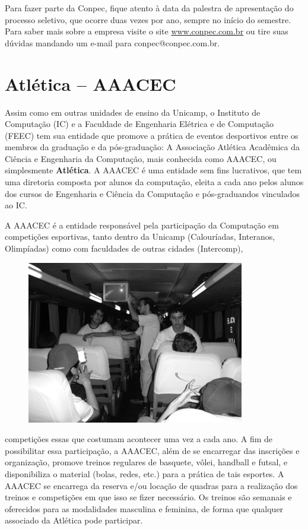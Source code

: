 Para fazer parte da Conpec, fique atento à data da palestra de apresentação do
processo seletivo, que ocorre duas vezes por ano, sempre no início do semestre.
Para saber mais sobre a empresa visite o site \url{www.conpec.com.br} ou
tire suas dúvidas mandando um e-mail para conpec@conpec.com.br.

\section{Atlética -- AAACEC}

Assim como em outras unidades de ensino da Unicamp, o Instituto de Computação
(IC) e a Faculdade de Engenharia Elétrica e de Computação (FEEC) tem sua
entidade que promove a prática de eventos desportivos entre os membros da
graduação e da pós-graduação: A Associação Atlética Acadêmica da Ciência
e Engenharia da Computação, mais conhecida como AAACEC, ou simplesmente
\textbf{Atlética}. A AAACEC é uma entidade sem fins lucrativos, que tem uma
diretoria composta por alunos da computação, eleita a cada ano pelos alunos
dos cursos de Engenharia e Ciência da Computação e pós-graduandos vinculados ao IC.

A AAACEC é a entidade responsável pela participação da Computação em competições
esportivas, tanto dentro da Unicamp (Calouríadas, Interanos, Olimpíadas) como
com faculdades de outras cidades (Intercomp),
\begin{figure}[h!]
    \vspace{-10pt}
    \centering
    \includegraphics[scale=0.75, keepaspectratio=true]{img/imgs/20-aaacec/-096.jpg}
    \vspace{-10pt}
\end{figure}
competições essas que costumam
acontecer uma vez a cada ano. A fim de possibilitar essa participação, a AAACEC,
além de se encarregar das inscrições e organização, promove treinos regulares de
basquete, vôlei, handball e futsal, e disponibiliza o material (bolas, redes,
etc.) para a prática de tais esportes. A AAACEC se encarrega da reserva e/ou
locação de quadras para a realização dos treinos e competições em que isso se
fizer necessário. Os treinos são semanais e oferecidos para as modalidades
masculina e feminina, de forma que qualquer associado da Atlética pode
participar.

